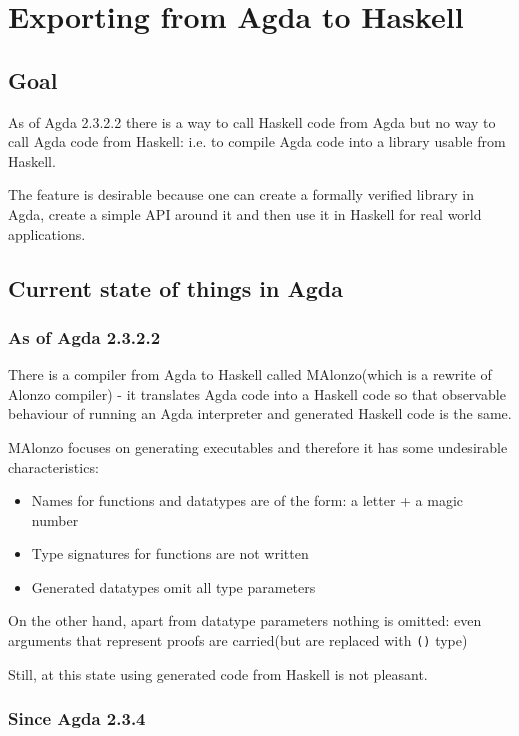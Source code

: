 \section{Exporting from Agda to Haskell}

\subsection{Goal}

As of Agda 2.3.2.2 there is a way to call Haskell code from Agda but no way to call Agda code from Haskell:
i.e. to compile Agda code into a library usable from Haskell.

The feature is desirable because one can create a formally verified library in Agda, create a simple API
around it and then use it in Haskell for real world applications.

\subsection{Current state of things in Agda}

\subsubsection{As of Agda 2.3.2.2}

There is a compiler from Agda to Haskell called MAlonzo\cite{MAlonzo}(which is
a rewrite of Alonzo\cite{Alonzo} compiler) - it translates Agda code
into a Haskell code so that observable behaviour of running an Agda interpreter and generated Haskell code is the same.

MAlonzo focuses on generating executables and therefore it has some undesirable characteristics:
\begin{itemize}
\item Names for functions and datatypes are of the form: a letter + a magic number
\item Type signatures for functions are not written
\item Generated datatypes omit all type parameters
\end{itemize}

On the other hand, apart from datatype parameters nothing is omitted:
even arguments that represent proofs are carried(but are replaced with \texttt{()} type)

Still, at this state using generated code from Haskell is not pleasant.

\subsubsection{Since Agda 2.3.4}


